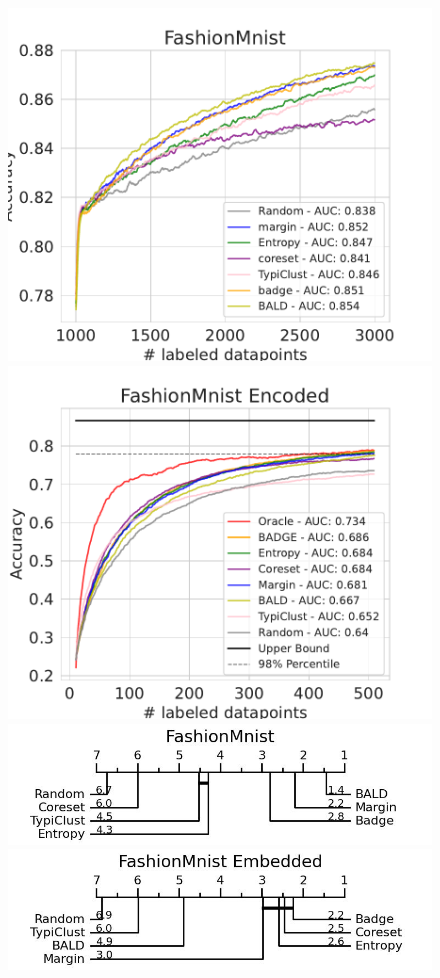 \documentclass[]{article}
\begin{document}
\begin{figure}[H]
\centering
\includegraphics[width=0.49\linewidth]{img/eval_fmnist}
\includegraphics[width=0.49\linewidth]{img/eval_fmnist_enc} \\ [2mm]
\includegraphics[width=0.49\linewidth]{img/micro_fmnist.jpg}
\includegraphics[width=0.49\linewidth]{img/micro_fmnist_enc.jpg} \\ [4mm]
\end{figure}
\end{document}

